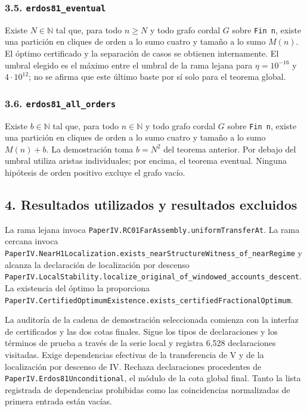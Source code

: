 \documentclass[spanish,11pt,a4paper]{article}
\begin{document}
\subsubsection{\texorpdfstring{3.5.
\nolinkurl{erdos81_eventual}}{3.5. erdos81\_eventual}}\label{erdos81_eventual}

Existe \(N\in\mathbb N\) tal que, para todo \(n\ge N\) y todo grafo
cordal \(G\) sobre \texttt{Fin\ n}, existe una partición en cliques de
orden a lo sumo cuatro y tamaño a lo sumo \(M(n)\). El óptimo
certificado y la separación de casos se obtienen internamente. El umbral
elegido es el máximo entre el umbral de la rama lejana para
\(\eta=10^{-16}\) y \(4\cdot10^{12}\); no se afirma que este último
baste por sí solo para el teorema global.

\subsubsection{\texorpdfstring{3.6.
\nolinkurl{erdos81_all_orders}}{3.6. erdos81\_all\_orders}}\label{erdos81_all_orders}

Existe \(b\in\mathbb N\) tal que, para todo \(n\in\mathbb N\) y todo
grafo cordal \(G\) sobre \texttt{Fin\ n}, existe una partición en
cliques de orden a lo sumo cuatro y tamaño a lo sumo \(M(n)+b\). La
demostración toma \(b=N^2\) del teorema anterior. Por debajo del umbral
utiliza aristas individuales; por encima, el teorema eventual. Ninguna
hipótesis de orden positivo excluye el grafo vacío.

\subsection{4. Resultados utilizados y resultados
excluidos}\label{resultados-utilizados-y-resultados-excluidos}

La rama lejana invoca
\nolinkurl{PaperIV.RC01FarAssembly.uniformTransferAt}. La rama cercana
invoca
\nolinkurl{PaperIV.NearH1Localization.exists_nearStructureWitness_of_nearRegime}
y alcanza la declaración de localización por descenso
\nolinkurl{PaperIV.LocalStability.localize_original_of_windowed_accounts_descent}.
La existencia del óptimo la proporciona
\nolinkurl{PaperIV.CertifiedOptimumExistence.exists_certifiedFractionalOptimum}.

La auditoría de la cadena de demostración seleccionada comienza con la
interfaz de certificados y las dos cotas finales. Sigue los tipos de
declaraciones y los términos de prueba a través de la serie local y
registra 6,528 declaraciones visitadas. Exige dependencias efectivas de
la transferencia de V y de la localización por descenso de IV. Rechaza
declaraciones procedentes de \nolinkurl{PaperIV.Erdos81Unconditional}, el
módulo de la cota global final. Tanto la lista registrada de
dependencias prohibidas como las coincidencias normalizadas de primera
entrada están vacías.
\end{document}
